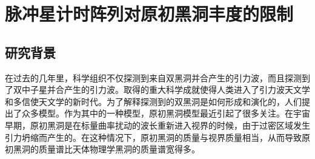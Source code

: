 \chapter{脉冲星计时阵列对原初黑洞丰度的限制}\label{chap:PTAfPBH}


\section{研究背景}
在过去的几年里，\lvc 科学组织不仅探测到来自双黑洞并合\cite{Abbott:2016blz,Abbott:2016nmj,Abbott:2017vtc,  Abbott:2017gyy,Abbott:2017oio,TheLIGOScientific:2016pea,LIGOScientific:2018mvr}产生的引力波，而且探测到了双中子星并合\cite{TheLIGOScientific:2017qsa}产生的引力波。\lvc 取得的重大科学成就使得人类进入了引力波天文学和多信使天文学的新时代。为了解释\lvc 探测到的双黑洞是如何形成和演化的，人们提出了众多模型\cite{Fishbach:2017dwv,Antonini:2016gqe,Inayoshi:2017mrs,Perna:2019axr,Rodriguez:2015oxa,Rodriguez:2016kxx,Park:2017zgj,Belczynski:2014iua,Belczynski:2016obo,Woosley:2016nnw,Rodriguez:2018rmd,Choksi:2018jnq,deMink:2010zm,deMink:2016vkw,Bird:2016dcv,Sasaki:2016jop,Clesse:2016vqa,Wang:2016ana,Ali-Haimoud:2017rtz,Chen:2018czv,Chen:2018rzo,Kavanagh:2018ggo,Raidal:2018bbj,Liu:2018ess,Chen:2019irf,Yuan:2019udt,Liu:2019rnx}。作为其中的一种模型，原初黑洞模型\cite{Bird:2016dcv,Sasaki:2016jop,Chen:2018czv}最近引起了很多关注。在宇宙早期，原初黑洞是在标量曲率扰动的波长重新进入视界的时候，由于过密区域发生引力坍缩而产生的\cite{Ivanov:1994pa,Yokoyama:1995ex,GarciaBellido:1996qt,Ivanov:1997ia,Kawasaki:2006zv}。在这种情况下，原初黑洞的质量与视界质量相当\cite{Carr:1975qj}，从而导致原初黑洞的质量谱比天体物理学黑洞的质量谱宽得多。

